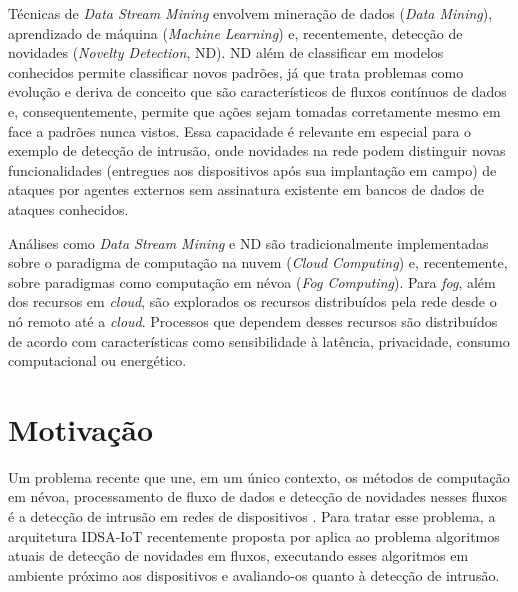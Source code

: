 

\newcommand{\nd}{ND\xspace}

Técnicas de \emph{Data Stream Mining} envolvem mineração de dados
(\emph{Data Mining}), aprendizado de
máquina (\emph{Machine Learning}) e, recentemente, detecção de novidades
(\emph{Novelty Detection}, \nd).
ND além de classificar em modelos conhecidos permite classificar novos padrões,
já que trata problemas como evolução e deriva de conceito que são característicos
de fluxos contínuos de dados e, consequentemente, permite que ações sejam tomadas corretamente mesmo
em face a padrões nunca vistos.
Essa capacidade é relevante em especial para o
exemplo de detecção de intrusão, onde novidades na rede podem distinguir novas
funcionalidades (entregues aos dispositivos após sua implantação em campo) de
ataques por agentes externos sem assinatura existente em bancos de
dados de ataques conhecidos.


Análises como \emph{Data Stream Mining} e ND são tradicionalmente implementadas
sobre o paradigma de computação na nuvem
(\emph{Cloud Computing}) e, recentemente, sobre paradigmas como computação em névoa
(\emph{Fog Computing}). Para \emph{fog}, além dos recursos em \emph{cloud}, são
explorados os recursos distribuídos pela rede desde o nó remoto até a
\emph{cloud}. Processos que dependem desses recursos são distribuídos de acordo
com características como sensibilidade à latência, privacidade,
consumo computacional ou energético.

\section{Motivação}\label{sec:motivo}

\newcommand{\idsiot}{IDSA-IoT\xspace}

Um problema recente que une, em um único contexto, os métodos de computação em
névoa, processamento de fluxo de dados e detecção de novidades nesses fluxos é a
detecção de intrusão em redes de dispositivos \iot.
Para tratar esse problema, a arquitetura \idsiot recentemente proposta por
 aplica ao problema algoritmos atuais de detecção de
novidades em fluxos, executando esses algoritmos em ambiente próximo aos
dispositivos e avaliando-os quanto à detecção de intrusão.

